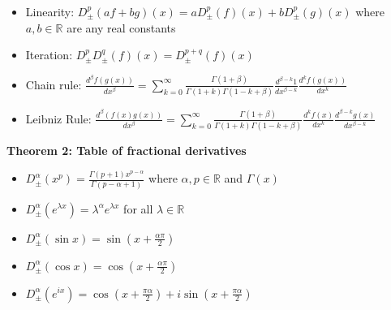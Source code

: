 \documentclass[12pt]{article}
\begin{document}
\begin{itemize}
\item {\rm Linearity}:  $D^p_{\pm}(a f+ b g)(x) = a D^p_{\pm}(f)(x) + b D^p_{\pm}(g)(x)$ where $a,b\in {\mathbb R}$ are any real constants
\item {\rm Iteration}:  $D^p_{\pm}D^q_{\pm}(f)(x) = D^{p+q}_{\pm}(f)(x)$
\item {\rm Chain rule}:  $\displaystyle{\frac{d^\beta f(g(x))}{dx^{\beta}} 
=\sum_{k=0}^{\infty}\frac{\Gamma(1+\beta)}{\Gamma(1+k)\Gamma(1-k+\beta)}
\frac{d^{\beta-k}1}{dx^{\beta-k}}
\frac{d^k f(g(x))}{dx^k} }$
\item {\rm Leibniz Rule}:   $\displaystyle{\frac{d^\beta (f(x)g(x))}{dx^\beta}
=\sum_{k=0}^{\infty}\frac{\Gamma(1+\beta)}{\Gamma(1+k)\Gamma(1-k+\beta)}
\frac{d^k f(x)}{dx^k} \frac{d^{\beta-k}g(x)}{dx^{\beta-k}} }$
\end{itemize}

{\bf Theorem 2: Table of fractional derivatives} 

\begin{itemize}
\item $\displaystyle{ D^{\alpha}_{\pm}(x^p)
=\frac{\Gamma (p+1)x^{p-\alpha}}{\Gamma (p-\alpha+1)} }$ where $\alpha,p\in {\mathbb R}$ and $\Gamma(x)$
\item $\displaystyle{ D^{\alpha}_{\pm}( e^{\lambda x} )
=\lambda^{\alpha} e^{\lambda x} }$ for all $\lambda\in {\mathbb R}$
\item $\displaystyle{ D^{\alpha}_{\pm} (\sin x) = \sin \left(x+\frac{\alpha \pi}{2}\right)}$
\item $\displaystyle{ D^{\alpha}_{\pm} (\cos x) = \cos \left(x+\frac{\alpha \pi}{2}\right)}$
\item $\displaystyle{ D^{\alpha}_{\pm} (e^{i x}) =\cos \left(x+\frac{\pi\alpha}{2}\right)+i\sin \left(x+\frac{\pi\alpha}{2}\right) }$
\end{itemize}
\end{document}
